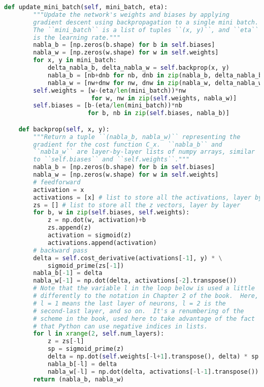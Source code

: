 \begin{fullwidth}
\begin{lstlisting}[caption={network.py (Python 2.7)},label={lst:network.py}, language=Python]
    def update_mini_batch(self, mini_batch, eta):
        """Update the network's weights and biases by applying
        gradient descent using backpropagation to a single mini batch.
        The ``mini_batch`` is a list of tuples ``(x, y)``, and ``eta``
        is the learning rate."""
        nabla_b = [np.zeros(b.shape) for b in self.biases]
        nabla_w = [np.zeros(w.shape) for w in self.weights]
        for x, y in mini_batch:
            delta_nabla_b, delta_nabla_w = self.backprop(x, y)
            nabla_b = [nb+dnb for nb, dnb in zip(nabla_b, delta_nabla_b)]
            nabla_w = [nw+dnw for nw, dnw in zip(nabla_w, delta_nabla_w)]
        self.weights = [w-(eta/len(mini_batch))*nw
                        for w, nw in zip(self.weights, nabla_w)]
        self.biases = [b-(eta/len(mini_batch))*nb
                       for b, nb in zip(self.biases, nabla_b)]

    def backprop(self, x, y):
        """Return a tuple ``(nabla_b, nabla_w)`` representing the
        gradient for the cost function C_x.  ``nabla_b`` and
        ``nabla_w`` are layer-by-layer lists of numpy arrays, similar
        to ``self.biases`` and ``self.weights``."""
        nabla_b = [np.zeros(b.shape) for b in self.biases]
        nabla_w = [np.zeros(w.shape) for w in self.weights]
        # feedforward
        activation = x
        activations = [x] # list to store all the activations, layer by layer
        zs = [] # list to store all the z vectors, layer by layer
        for b, w in zip(self.biases, self.weights):
            z = np.dot(w, activation)+b
            zs.append(z)
            activation = sigmoid(z)
            activations.append(activation)
        # backward pass
        delta = self.cost_derivative(activations[-1], y) * \
            sigmoid_prime(zs[-1])
        nabla_b[-1] = delta
        nabla_w[-1] = np.dot(delta, activations[-2].transpose())
        # Note that the variable l in the loop below is used a little
        # differently to the notation in Chapter 2 of the book.  Here,
        # l = 1 means the last layer of neurons, l = 2 is the
        # second-last layer, and so on.  It's a renumbering of the
        # scheme in the book, used here to take advantage of the fact
        # that Python can use negative indices in lists.
        for l in xrange(2, self.num_layers):
            z = zs[-l]
            sp = sigmoid_prime(z)
            delta = np.dot(self.weights[-l+1].transpose(), delta) * sp
            nabla_b[-l] = delta
            nabla_w[-l] = np.dot(delta, activations[-l-1].transpose())
        return (nabla_b, nabla_w)


\end{lstlisting}
\end{fullwidth}
